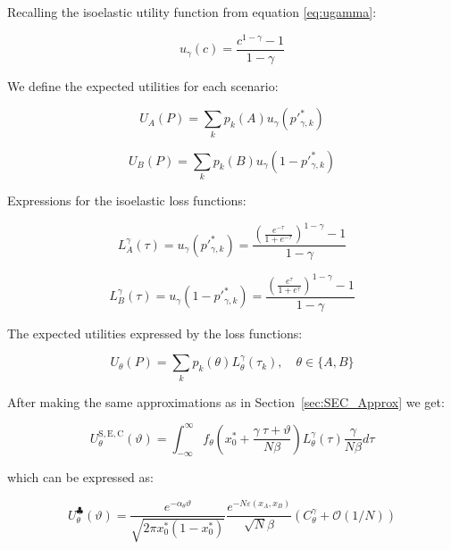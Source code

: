 \documentclass{article}
\theoremstyle{definition}
\begin{document}
Recalling the isoelastic utility function from equation \eqref{eq:ugamma}:

\begin{equation}
    u_\gamma(c) = \frac{c^{1-\gamma}-1}{1-\gamma}
\end{equation}

We define the expected utilities for each scenario:

\begin{equation}
    U_A(P) = \sum_{k} p_k(A) u_\gamma \left ( p'^*_{\gamma,k} \right )
\end{equation}

\begin{equation}
    U_B(P) = \sum_{k} p_k(B) u_\gamma \left ( 1 - p'^*_{\gamma,k} \right )
\end{equation}

Expressions for the isoelastic loss functions:

\begin{equation}
    L^\gamma_A(\tau) = u_\gamma \left ( p'^*_{\gamma,k} \right ) =
    \frac{\left ( \frac{e^{-\tau}}{1 + e^{-\tau}} \right )^{1-\gamma}-1}{1-\gamma} 
\end{equation}

\begin{equation}
    L^\gamma_B(\tau) = u_\gamma \left ( 1 - p'^*_{\gamma,k} \right ) =
    \frac{\left ( \frac{e^{\tau}}{1 + e^{\tau}} \right )^{1-\gamma}-1}{1-\gamma} 
\end{equation}

The expected utilities expressed by the loss functions:

\begin{equation}
    U_\theta(P) = \sum_{k} p_k(\theta) L^\gamma_\theta(\tau_k), \quad
    \theta \in \{A,B\}
\end{equation}

After making the same approximations as in Section~\ref{sec:SEC_Approx} we get:

\begin{equation}
    U_\theta^\mathrm{S,E,C}(\vartheta) = \int_{-\infty}^\infty 
    f_\theta \left ( x_0^* + \frac{\gamma \ \tau + \vartheta}{N \beta} \right ) L^\gamma_\theta(\tau) \frac{\gamma}{N \beta} d \tau
\end{equation}

which can be expressed as:

\begin{equation}
    U_\theta^\clubsuit(\vartheta) = 
    \frac{e^{-\alpha_\theta \vartheta}}{\sqrt{2 \pi x_0^* (1-x_0^*)}} \frac{e^{- N \varepsilon(x_A,x_B)}}{\sqrt{N} \beta}
    \left ( C^\gamma_\theta + \mathcal{O}(1/N) \right )
\end{equation}
\end{document}
